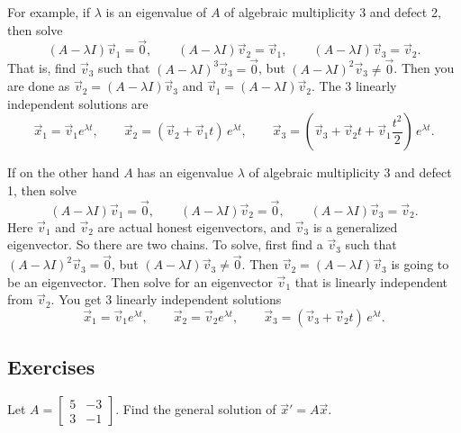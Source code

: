 For example, if $\lambda$ is an eigenvalue of $A$
of algebraic multiplicity 3 and defect 2, then solve
\begin{equation*}
(A - \lambda I) \vec{v}_1 = \vec{0} , \qquad
(A - \lambda I) \vec{v}_2 = \vec{v}_1 , \qquad
(A - \lambda I) \vec{v}_3 = \vec{v}_2 .
\end{equation*}
That is, find $\vec{v}_3$ such that 
${(A - \lambda I)}^3 \vec{v}_3 = \vec{0}$, but
${(A - \lambda I)}^2 \vec{v}_3 \not= \vec{0}$.
Then you are done as
$\vec{v}_2 = (A - \lambda I) \vec{v}_3$
and 
$\vec{v}_1 = (A - \lambda I) \vec{v}_2$.
The 3 linearly independent solutions are
\begin{equation*}
\vec{x}_1 = \vec{v}_1 e^{\lambda t} , \qquad
\vec{x}_2 = ( \vec{v}_2 + \vec{v}_1 t ) \, e^{\lambda t} , \qquad
\vec{x}_3 = \left( \vec{v}_3 + \vec{v}_2 t +
\vec{v}_{1} \frac{t^2}{2} \right) \, e^{\lambda t} .
\end{equation*}

If on the other hand $A$ has an eigenvalue $\lambda$
of algebraic multiplicity 3 and defect 1, then 
solve
\begin{equation*}
(A - \lambda I) \vec{v}_1 = \vec{0} , \qquad
(A - \lambda I) \vec{v}_2 = \vec{0} , \qquad
(A - \lambda I) \vec{v}_3 = \vec{v}_2 .
\end{equation*}
Here $\vec{v}_1$ and $\vec{v}_2$ are actual honest eigenvectors,
and $\vec{v}_3$ is a generalized eigenvector.
So there are two chains.
To solve, first find a 
$\vec{v}_3$ such that 
${(A - \lambda I)}^2 \vec{v}_3 = \vec{0}$, but
$(A - \lambda I) \vec{v}_3 \not= \vec{0}$.
Then $\vec{v}_2 = (A - \lambda I) \vec{v}_3$ is going to be an eigenvector.
Then solve for an eigenvector $\vec{v}_1$ that is linearly independent 
from $\vec{v}_2$.
You get 3 linearly independent solutions
\begin{equation*}
\vec{x}_1 = \vec{v}_1 e^{\lambda t} , \qquad
\vec{x}_2 = \vec{v}_2 e^{\lambda t} , \qquad
\vec{x}_3 = ( \vec{v}_3 + \vec{v}_2 t ) \, e^{\lambda t} .
\end{equation*}

\subsection{Exercises}

\begin{exercise}
Let
$A = \left[ \begin{smallmatrix} 5 & -3 \\ 3 & -1 \end{smallmatrix} \right]$.
Find the general solution of ${\vec{x}}' = A \vec{x}$.
\end{exercise}

